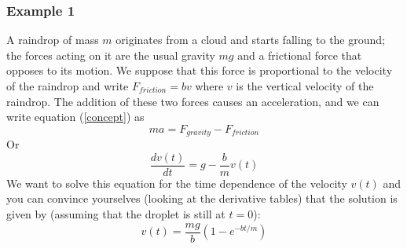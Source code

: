 \documentclass[11pt, a4paper,oneside,openright]{book}
\numberwithin{equation}{section}
\begin{document}
\subsubsection{Example 1}
A raindrop of mass $m$ originates from a cloud and starts falling to the ground; the forces acting on it are the usual gravity $mg$ and a frictional force that opposes to its motion. We suppose that this force is proportional to the velocity of the raindrop and write $F_{friction}=bv$ where $v$ is the vertical velocity of the raindrop. The addition of these two forces causes an acceleration, and we can write equation (\ref{concept}) as
\begin{equation}
ma=F_{gravity}-F_{friction}
\end{equation}
Or
\begin{equation}
\frac{dv(t)}{dt}=g-\frac{b}{m}v(t)
\end{equation}
We want to solve this equation for the time dependence of the velocity $v(t)$ and you can convince yourselves (looking at the derivative tables) that the solution is given by (assuming that the droplet is still at $t=0$):  
\begin{equation}
v(t)=\frac{mg}{b}(1-e^{-bt/m})
\end{equation}
\end{document}

